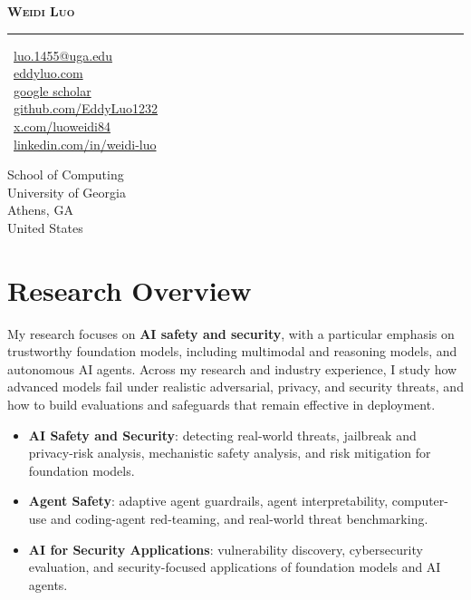 \documentclass[a4paper,11pt]{article}
\newcommand{\sepspace}{\vspace{6pt}}
\begin{document}
\begin{center}
    \Large{\textbf{\textsc{Weidi Luo}}}
\end{center}

\vspace{-18pt}
\noindent\rule{\textwidth}{0.4pt}
\vspace{0.5em}

\noindent
\begin{minipage}[t]{0.54\textwidth}
    \faEnvelope~\textcolor{linkpink}{\href{mailto:luo.1455@uga.edu}{luo.1455@uga.edu}}\\
    \faHome~\textcolor{linkpink}{\href{https://eddyluo.com/}{eddyluo.com}}\\
    \faGoogle~\textcolor{linkpink}{\href{https://scholar.google.com/citations?user=EZzmjVUAAAAJ}{google scholar}}\\
    \faGithub~\textcolor{linkpink}{\href{https://github.com/EddyLuo1232}{github.com/EddyLuo1232}}\\
    \faTwitter~\textcolor{linkpink}{\href{https://x.com/luoweidi84}{x.com/luoweidi84}}\\
    \faLinkedin~\textcolor{linkpink}{\href{https://www.linkedin.com/in/weidi-luo-aa02b5242}{linkedin.com/in/weidi-luo}}
\end{minipage}
\begin{minipage}[t]{0.46\textwidth}
    \raggedleft
    School of Computing\\
    University of Georgia\\
    Athens, GA\\
    United States\\
\end{minipage}

\sepspace
\section*{Research Overview}

My research focuses on \textbf{AI safety and security}, with a particular emphasis on trustworthy foundation models, including multimodal and reasoning models, and autonomous AI agents. Across my research and industry experience, I study how advanced models fail under realistic adversarial, privacy, and security threats, and how to build evaluations and safeguards that remain effective in deployment.

\begin{itemize}[leftmargin=1.2em,itemsep=2pt,topsep=4pt]
    \item[$\circ$] \textbf{AI Safety and Security}: detecting real-world threats, jailbreak and privacy-risk analysis, mechanistic safety analysis, and risk mitigation for foundation models.
    \item[$\circ$] \textbf{Agent Safety}: adaptive agent guardrails, agent interpretability, computer-use and coding-agent red-teaming, and real-world threat benchmarking.
    \item[$\circ$] \textbf{AI for Security Applications}: vulnerability discovery, cybersecurity evaluation, and security-focused applications of foundation models and AI agents.
\end{itemize}
\end{document}
